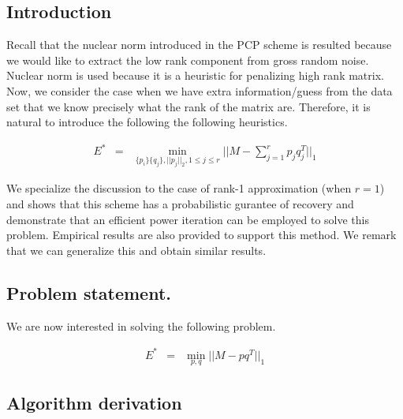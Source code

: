 \documentclass{../common/projectreport}
\begin{document}
\subsection{Introduction }

Recall that the nuclear norm introduced in the PCP scheme is resulted because we would like to extract the low rank component from gross random noise. Nuclear norm is used because it is a heuristic for penalizing high rank matrix. Now, we consider the case when we have extra information/guess from the data set that we know precisely what the rank of the matrix are. Therefore, it is natural to introduce the following the following heuristics. 

\begin{eqnarray*}
E^{*} & = & \min_{\{p_{i}\}\{q_{j}\},||p_{j}||_{2},1\le j\le r}||M-\sum_{j=1}^{r}p_{j}q_{j}^{T}||_{1}
\end{eqnarray*}


We specialize the discussion to the case of rank-1 approximation (when $r=1$) and shows that this scheme has a  probabilistic gurantee of recovery and demonstrate that an efficient power iteration can be employed to solve this problem. Empirical results are also provided to support this method. We remark that we can generalize this and obtain similar results. 


\subsection{Problem statement.}

We are now interested in solving the following problem. 

\begin{eqnarray}
E^{*} & = & \min_{p,q}||M-pq^{T}||_{1}\label{rankonemin}
\end{eqnarray}



\subsection{Algorithm derivation}
\end{document}
